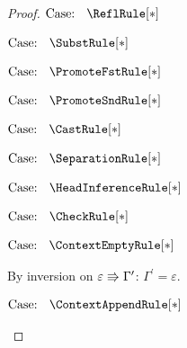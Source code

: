 \begin{proof}
    $\text{Case: }\begin{array}{c} \ReflRule[*] \end{array}$
    \begin{proofcase}
    \end{proofcase}

    $\text{Case: }\begin{array}{c} \SubstRule[*] \end{array}$
    \begin{proofcase}
    \end{proofcase}

    $\text{Case: }\begin{array}{c} \PromoteFstRule[*] \end{array}$
    \begin{proofcase}
    \end{proofcase}

    $\text{Case: }\begin{array}{c} \PromoteSndRule[*] \end{array}$
    \begin{proofcase}
    \end{proofcase}

    $\text{Case: }\begin{array}{c} \CastRule[*] \end{array}$
    \begin{proofcase}
    \end{proofcase}

    $\text{Case: }\begin{array}{c} \SeparationRule[*] \end{array}$
    \begin{proofcase}
    \end{proofcase}

    $\text{Case: }\begin{array}{c} \HeadInferenceRule[*] \end{array}$
    \begin{proofcase}
    \end{proofcase}

    $\text{Case: }\begin{array}{c} \CheckRule[*] \end{array}$
    \begin{proofcase}
    \end{proofcase}

    $\text{Case: }\begin{array}{c} \ContextEmptyRule[*] \end{array}$
    \begin{proofcase}
        By inversion on $\varepsilon \Rrightarrow \Gamma^\prime$: $\Gamma^\prime = \varepsilon$.
    \end{proofcase}

    $\text{Case: }\begin{array}{c} \ContextAppendRule[*] \end{array}$
    \begin{proofcase}
    \end{proofcase}
\end{proof}